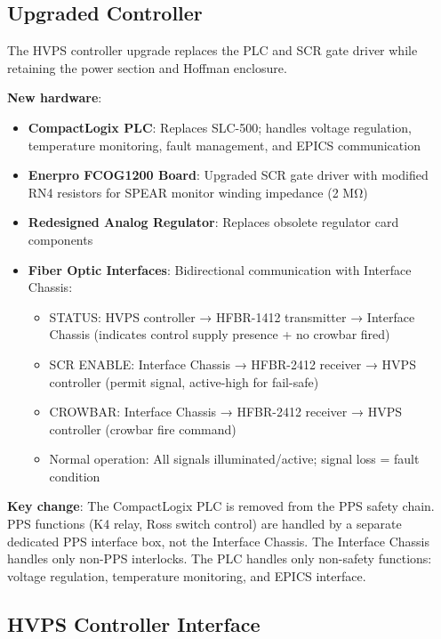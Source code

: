 \subsection{Upgraded Controller}\label{upgraded-controller}

The HVPS controller upgrade replaces the PLC and SCR gate driver while retaining the power section and Hoffman enclosure.

\textbf{New hardware}:

\begin{itemize}
\tightlist
\item
  \textbf{CompactLogix PLC}: Replaces SLC-500; handles voltage regulation, temperature monitoring, fault management, and EPICS communication
\item
  \textbf{Enerpro FCOG1200 Board}: Upgraded SCR gate driver with modified RN4 resistors for SPEAR monitor winding impedance (2 MΩ)
\item
  \textbf{Redesigned Analog Regulator}: Replaces obsolete regulator card components
\item
  \textbf{Fiber Optic Interfaces}: Bidirectional communication with Interface Chassis:

  \begin{itemize}
  \tightlist
  \item
    STATUS: HVPS controller → HFBR-1412 transmitter → Interface Chassis (indicates control supply presence + no crowbar fired)
  \item
    SCR ENABLE: Interface Chassis → HFBR-2412 receiver → HVPS controller (permit signal, active-high for fail-safe)
  \item
    CROWBAR: Interface Chassis → HFBR-2412 receiver → HVPS controller (crowbar fire command)
  \item
    Normal operation: All signals illuminated/active; signal loss = fault condition
  \end{itemize}
\end{itemize}

\textbf{Key change}: The CompactLogix PLC is removed from the PPS safety chain. PPS functions (K4 relay, Ross switch control) are handled by a separate dedicated PPS interface box, not the Interface Chassis. The Interface Chassis handles only non-PPS interlocks. The PLC handles only non-safety functions: voltage regulation, temperature monitoring, and EPICS interface.

\subsection{HVPS Controller Interface}\label{hvps-controller-interface}

